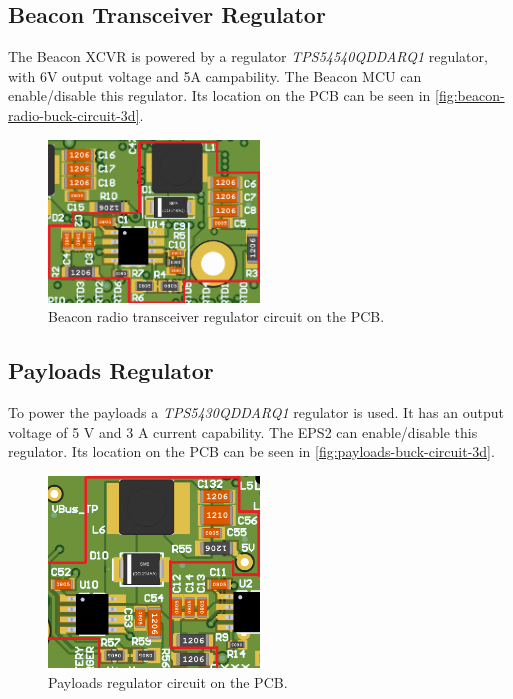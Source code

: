 \subsection{Beacon Transceiver Regulator}

The Beacon XCVR is powered by a regulator \textit{TPS54540QDDARQ1} regulator, with 6V output voltage and 5A campability. The Beacon MCU can enable/disable this regulator.
Its location on the PCB can be seen in \autoref{fig:beacon-radio-buck-circuit-3d}.

\begin{figure}[!ht]
    \begin{center}
        \includegraphics[width=0.5\textwidth]{figures/beacon-radio-buck-circuit-3d.png}
        \caption{Beacon radio transceiver regulator circuit on the PCB.}
        \label{fig:beacon-radio-buck-circuit-3d}
    \end{center}
\end{figure}

\subsection{Payloads Regulator}

To power the payloads a \textit{TPS5430QDDARQ1} regulator is used. It has an output voltage of 5 V and 3 A current capability. The EPS2 can enable/disable this regulator.
Its location on the PCB can be seen in \autoref{fig:payloads-buck-circuit-3d}.

\begin{figure}[!ht]
    \begin{center}
        \includegraphics[width=0.5\textwidth]{figures/payloads-buck-circuit-3d.png}
        \caption{Payloads regulator circuit on the PCB.}
        \label{fig:payloads-buck-circuit-3d}
    \end{center}
\end{figure}

